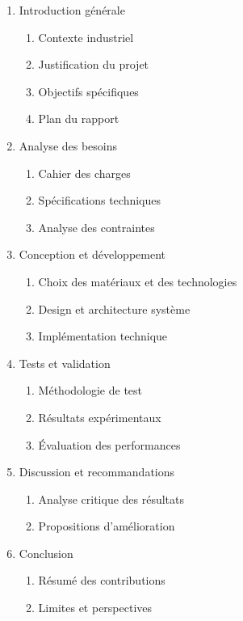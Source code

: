\begin{enumerate}[label=\arabic*.]
    \item Introduction générale
          \begin{enumerate}[label=\arabic{enumi}.\arabic*]
              \item Contexte industriel
              \item Justification du projet
              \item Objectifs spécifiques
              \item Plan du rapport
          \end{enumerate}
    \item Analyse des besoins
          \begin{enumerate}[label=\arabic{enumi}.\arabic*]
              \item Cahier des charges
              \item Spécifications techniques
              \item Analyse des contraintes
          \end{enumerate}
    \item Conception et développement
          \begin{enumerate}[label=\arabic{enumi}.\arabic*]
              \item Choix des matériaux et des technologies
              \item Design et architecture système
              \item Implémentation technique
          \end{enumerate}
    \item Tests et validation
          \begin{enumerate}[label=\arabic{enumi}.\arabic*]
              \item Méthodologie de test
              \item Résultats expérimentaux
              \item Évaluation des performances
          \end{enumerate}
    \item Discussion et recommandations
          \begin{enumerate}[label=\arabic{enumi}.\arabic*]
              \item Analyse critique des résultats
              \item Propositions d'amélioration
          \end{enumerate}
    \item Conclusion
          \begin{enumerate}[label=\arabic{enumi}.\arabic*]
              \item Résumé des contributions
              \item Limites et perspectives
          \end{enumerate}
\end{enumerate}

